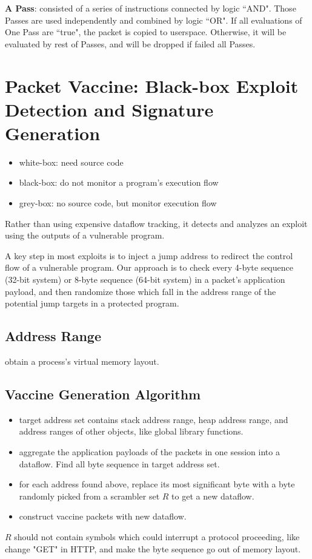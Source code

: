 \documentclass[]{article}
\begin{document}
\textbf{A Pass}: consisted of a series of instructions connected by logic
``AND". Those Passes are used independently and combined by logic
``OR". If all evaluations of One Pass are ``true", the packet is copied to
userspace. Otherwise, it will be evaluated by rest of Passes, and will be
dropped if failed all Passes.

\section{Packet Vaccine: Black-box Exploit Detection and 
Signature Generation}
\begin{itemize}
 \item white-box: need source code
 \item black-box: do not monitor a program's execution flow
 \item grey-box: no source code, but monitor execution flow
\end{itemize}

Rather than using expensive dataflow tracking, it detects and analyzes an
 exploit using the outputs of a vulnerable program.

A key step in most exploits is to inject a jump address to redirect the control
flow of a vulnerable program. Our approach is to check every 4-byte 
sequence (32-bit system) or 8-byte sequence (64-bit system) in a packet's
application payload, and then randomize those which fall in the address 
range of the potential jump targets in a protected program. 

\subsection{Address Range}
obtain a process's virtual memory layout.

\subsection{Vaccine Generation Algorithm}
\begin{itemize}
 \item  target address set contains
 stack address range, heap address range, and address ranges of 
 other objects, like global library functions.
 \item aggregate the application payloads of the packets in one 
 session into a dataflow. Find all byte sequence in target address 
 set.
 \item for each address found above, replace its most significant
 byte with a byte randomly picked from a scrambler set $R$ to get a
 new dataflow.
 \item construct vaccine packets with new dataflow.
\end{itemize}
$R$ should not contain symbols which could interrupt a protocol 
proceeding, like change "GET" in HTTP, and make the byte 
sequence go out of memory layout.
\end{document}
